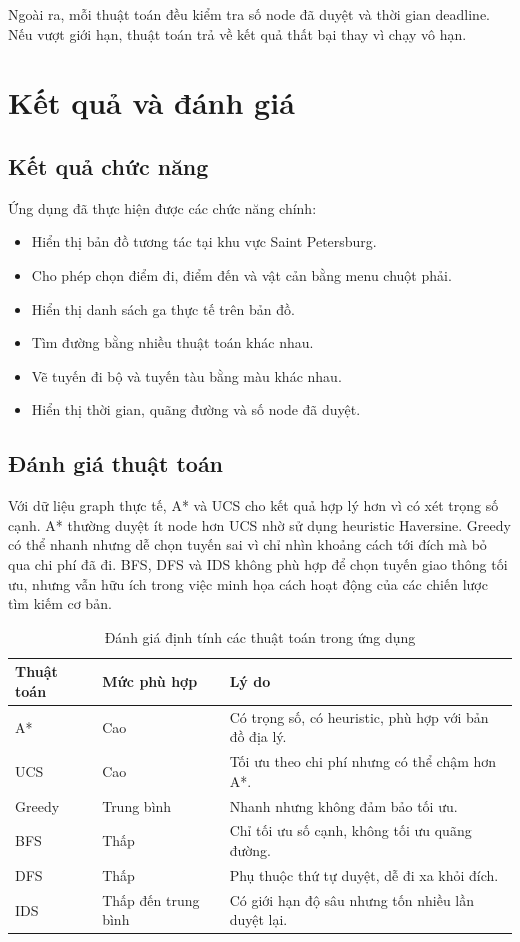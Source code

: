 \documentclass[12pt,a4paper]{article}
\begin{document}
Ngoài ra, mỗi thuật toán đều kiểm tra số node đã duyệt và thời gian deadline. Nếu vượt giới hạn, thuật toán trả về kết quả thất bại thay vì chạy vô hạn.

\section{Kết quả và đánh giá}

\subsection{Kết quả chức năng}

Ứng dụng đã thực hiện được các chức năng chính:

\begin{itemize}
    \item Hiển thị bản đồ tương tác tại khu vực Saint Petersburg.
    \item Cho phép chọn điểm đi, điểm đến và vật cản bằng menu chuột phải.
    \item Hiển thị danh sách ga thực tế trên bản đồ.
    \item Tìm đường bằng nhiều thuật toán khác nhau.
    \item Vẽ tuyến đi bộ và tuyến tàu bằng màu khác nhau.
    \item Hiển thị thời gian, quãng đường và số node đã duyệt.
\end{itemize}

\subsection{Đánh giá thuật toán}

Với dữ liệu graph thực tế, A* và UCS cho kết quả hợp lý hơn vì có xét trọng số cạnh. A* thường duyệt ít node hơn UCS nhờ sử dụng heuristic Haversine. Greedy có thể nhanh nhưng dễ chọn tuyến sai vì chỉ nhìn khoảng cách tới đích mà bỏ qua chi phí đã đi. BFS, DFS và IDS không phù hợp để chọn tuyến giao thông tối ưu, nhưng vẫn hữu ích trong việc minh họa cách hoạt động của các chiến lược tìm kiếm cơ bản.

\begin{table}[h]
\centering
\caption{Đánh giá định tính các thuật toán trong ứng dụng}
\label{tab:evaluation}
\begin{tabular}{p{3cm}p{3cm}p{6cm}}
\toprule
\textbf{Thuật toán} & \textbf{Mức phù hợp} & \textbf{Lý do} \\
\midrule
A* & Cao & Có trọng số, có heuristic, phù hợp với bản đồ địa lý. \\
UCS & Cao & Tối ưu theo chi phí nhưng có thể chậm hơn A*. \\
Greedy & Trung bình & Nhanh nhưng không đảm bảo tối ưu. \\
BFS & Thấp & Chỉ tối ưu số cạnh, không tối ưu quãng đường. \\
DFS & Thấp & Phụ thuộc thứ tự duyệt, dễ đi xa khỏi đích. \\
IDS & Thấp đến trung bình & Có giới hạn độ sâu nhưng tốn nhiều lần duyệt lại. \\
\bottomrule
\end{tabular}
\end{table}
\end{document}
